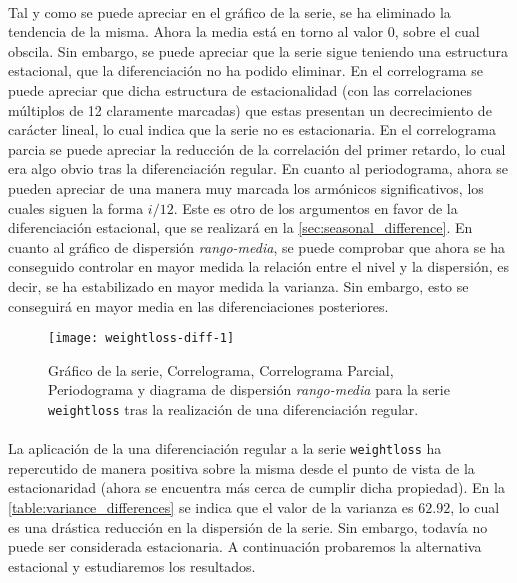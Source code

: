 \documentclass[a4paper, spanish]{article}
\begin{document}
        \paragraph{}
        Tal y como se puede apreciar en el gráfico de la serie, se ha eliminado la tendencia de la misma. Ahora la media está en torno al valor $0$, sobre el cual obscila. Sin embargo, se puede apreciar que la serie sigue teniendo una estructura estacional, que la diferenciación no ha podido eliminar. En el correlograma se puede apreciar que dicha estructura de estacionalidad (con las correlaciones múltiplos de 12 claramente marcadas) que estas presentan un decrecimiento de carácter lineal, lo cual indica que la serie no es estacionaria. En el correlograma parcia se puede apreciar la reducción de la correlación del primer retardo, lo cual era algo obvio tras la diferenciación regular. En cuanto al periodograma, ahora se pueden apreciar de una manera muy marcada los armónicos significativos, los cuales siguen la forma $i / 12$. Este es otro de los argumentos en favor de la diferenciación estacional, que se realizará en la \autoref{sec:seasonal_difference}. En cuanto al gráfico de dispersión \emph{rango-media}, se puede comprobar que ahora se ha conseguido controlar en mayor medida la relación entre el nivel y la dispersión, es decir, se ha estabilizado en mayor medida la varianza. Sin embargo, esto se conseguirá en mayor media en las diferenciaciones posteriores.

        \begin{figure}[htb!]
          \texttt{[image: weightloss-diff-1]}
          \caption{Gráfico de la serie, Correlograma, Correlograma Parcial, Periodograma y diagrama de dispersión \emph{rango-media} para la serie \texttt{weightloss} tras la realización de una diferenciación regular.}
          \label{img:weightloss_diff_1}
        \end{figure}

        \paragraph{}
        La aplicación de la una diferenciación regular a la serie \texttt{weightloss} ha repercutido de manera positiva sobre la misma desde el punto de vista de la estacionaridad (ahora se encuentra más cerca de cumplir dicha propiedad). En la \autoref{table:variance_differences} se indica que el valor de la varianza es $62.92$, lo cual es una drástica reducción en la dispersión de la serie. Sin embargo, todavía no puede ser considerada estacionaria. A continuación probaremos la alternativa estacional y estudiaremos los resultados.
\end{document}
